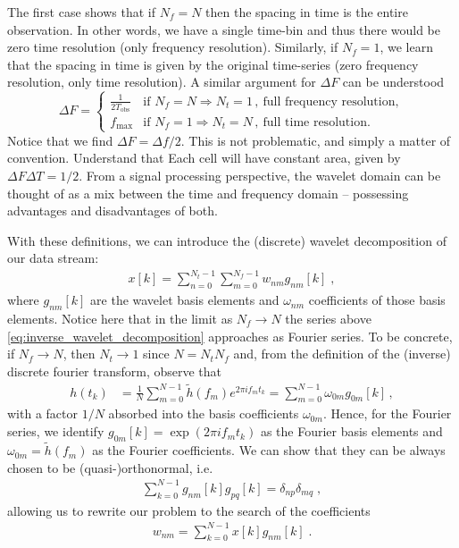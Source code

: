 \documentclass{article}
\begin{document}
The first case shows that if $N_{f} = N$ then the spacing in time is the entire observation. In other words, we have a single time-bin and thus there would be zero time resolution (only frequency resolution). Similarly, if $N_{f} = 1$, we learn that the spacing in time is given by the original time-series (zero frequency resolution, only time resolution). A similar argument for $\Delta F$ can be understood
\begin{equation}
\Delta F = 
\begin{cases} 
\frac{1}{2T_{\text{obs}}} & \text{if } N_{f} = N \Rightarrow N_{t} = 1\,, \ \text{full frequency resolution}, \\
f_{\text{max}} & \text{if } N_{f} = 1 \Rightarrow N_{t} = N\,, \ \text{full time resolution}.
\end{cases}
\end{equation}
Notice that we find $\Delta F = \Delta f / 2$. This is not problematic, and simply a matter of convention. Understand that Each cell will have constant area, given by $\Delta F \Delta T = 1/2$. From a signal processing perspective, the wavelet domain can be thought of as a mix between the time and frequency domain -- possessing advantages and disadvantages of both.      

With these definitions, we can introduce the (discrete) wavelet decomposition of our data stream:
\begin{align}
\label{eq:inverse_wavelet_decomposition}
x[k]=\sum_{n=0}^{N_t-1}\sum_{m=0}^{N_f-1}w_{nm}g_{nm}[k]\;,
\end{align}
where $g_{nm}[k]$ are the wavelet basis elements and $\omega_{nm}$ coefficients of those basis elements. Notice here that in the limit as $N_{f}\rightarrow N$ the series above \eqref{eq:inverse_wavelet_decomposition} approaches as Fourier series. To be concrete, if $N_{f} \rightarrow N$, then $N_{t}\rightarrow 1$ since $N = N_{t}N_{f}$ and, from the definition of the (inverse) discrete fourier transform, observe that 
\begin{align}
h(t_{k}) &= \frac{1}{N}\sum_{m = 0}^{N -1}\tilde{h}(f_{m})e^{2\pi i f_{m}t_{k}} = \sum_{m = 0}^{N - 1}\omega_{0m}g_{0m}[k]\, ,\nonumber
\end{align}
with a factor $1/N$ absorbed into the basis coefficients $\omega_{0m}$. Hence, for the Fourier series, we identify $g_{0m}[k] = \exp(2\pi i f_{m}t_{k})$ as the Fourier basis elements and $\omega_{0m} = \tilde{h}(f_{m})$ as the Fourier coefficients. We can show that they can be always chosen to be (quasi-)orthonormal, i.e.
\begin{align}
\label{eq:orthonormality}
\sum_{k=0}^{N-1}g_{nm}[k]g_{pq}[k]=\delta_{np}\delta_{mq}\;,
\end{align}
allowing us to rewrite our problem to the search of the coefficients
\begin{align}\label{wnm_def}
w_{nm}=\sum_{k=0}^{N-1}x[k]g_{nm}[k]\;.
\end{align}
\end{document}
